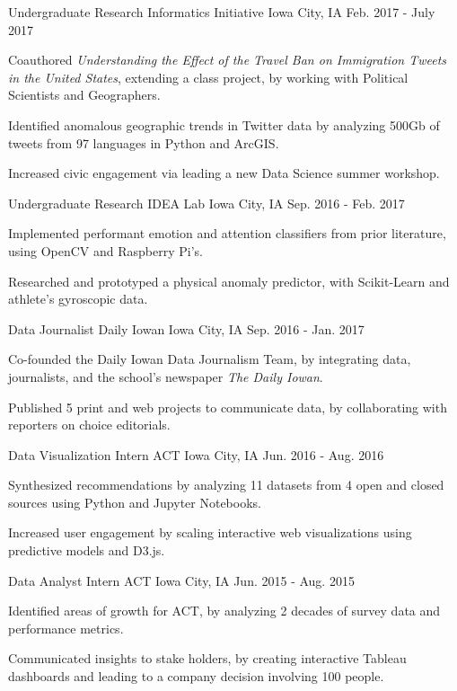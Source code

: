 \begin{cventries}
\cventry
  {Undergraduate Research}
  {Informatics Initiative}
  {Iowa City, IA}
  {Feb. 2017 - July 2017}
  {
    \begin{cvitems}
      \item {Coauthored \textit{Understanding the Effect of the Travel Ban on Immigration Tweets in the United States}, extending a class project, by working with Political Scientists and Geographers.}
      \item {Identified anomalous geographic trends in Twitter data by analyzing 500Gb of tweets from 97 languages in Python and ArcGIS.}
      \item {Increased civic engagement via leading a new Data Science summer workshop.}
    \end{cvitems}
  }
  \cventry
    {Undergraduate Research}
    {IDEA Lab}
    {Iowa City, IA}
    {Sep. 2016 - Feb. 2017}
    {
      \begin{cvitems}
        \item{Implemented performant emotion and attention classifiers from prior literature, using OpenCV and Raspberry Pi's.}
        \item {Researched and prototyped a physical anomaly predictor, with Scikit-Learn and athlete's gyroscopic data. }
      \end{cvitems}
    }
  \cventry
    {Data Journalist}
    {Daily Iowan}
    {Iowa City, IA}
    {Sep. 2016 - Jan. 2017}
    {
      \begin{cvitems}
        \item {Co-founded the Daily Iowan Data Journalism Team, by integrating data, journalists, and the school's newspaper \textit{The Daily Iowan}.}
        \item {Published 5 print and web projects to communicate data, by collaborating with reporters on choice editorials.}
      \end{cvitems}
    }
  \cventry
    {Data Visualization Intern}
    {ACT}
    {Iowa City, IA}
    {Jun. 2016 - Aug. 2016}
    {
      \begin{cvitems}
        \item {Synthesized recommendations by analyzing 11 datasets from 4 open and closed sources using Python and Jupyter Notebooks. }
        \item {Increased user engagement by scaling interactive web visualizations using predictive models and D3.js.}
      \end{cvitems}
    }
  \cventry
    {Data Analyst Intern}
    {ACT}
    {Iowa City, IA}
    {Jun. 2015 - Aug. 2015}
    {
      \begin{cvitems}
        \item {Identified areas of growth for ACT, by analyzing 2 decades of survey data and performance metrics.}
        \item {Communicated insights to stake holders, by creating interactive Tableau dashboards and leading to a company decision involving 100 people.}
      \end{cvitems}
    }

\end{cventries}
